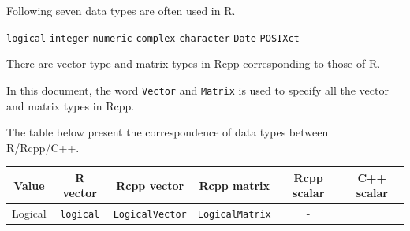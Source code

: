 \documentclass[]{book}
\begin{document}
Following seven data types are often used in R.

\texttt{logical} \texttt{integer} \texttt{numeric} \texttt{complex} \texttt{character} \texttt{Date} \texttt{POSIXct}

There are vector type and matrix types in Rcpp corresponding to those of R.

In this document, the word \texttt{Vector} and \texttt{Matrix} is used to specify all the vector and matrix types in Rcpp.

The table below present the correspondence of data types between R/Rcpp/C++.

\begin{longtable}[]{@{}cccccc@{}}
\toprule
\begin{minipage}[b]{0.14\columnwidth}\centering
Value\strut
\end{minipage} & \begin{minipage}[b]{0.14\columnwidth}\centering
R vector\strut
\end{minipage} & \begin{minipage}[b]{0.14\columnwidth}\centering
Rcpp vector\strut
\end{minipage} & \begin{minipage}[b]{0.14\columnwidth}\centering
Rcpp matrix\strut
\end{minipage} & \begin{minipage}[b]{0.14\columnwidth}\centering
Rcpp scalar\strut
\end{minipage} & \begin{minipage}[b]{0.14\columnwidth}\centering
C++ scalar\strut
\end{minipage}\tabularnewline
\midrule
\endhead
\begin{minipage}[t]{0.14\columnwidth}\centering
Logical\strut
\end{minipage} & \begin{minipage}[t]{0.14\columnwidth}\centering
\texttt{logical}\strut
\end{minipage} & \begin{minipage}[t]{0.14\columnwidth}\centering
\texttt{LogicalVector}\strut
\end{minipage} & \begin{minipage}[t]{0.14\columnwidth}\centering
\texttt{LogicalMatrix}\strut
\end{minipage} & \begin{minipage}[t]{0.14\columnwidth}\centering
-\strut
\end{minipage} & \begin{minipage}[t]{0.14\columnwidth}\centering

\end{minipage}
\end{longtable}
\end{document}
